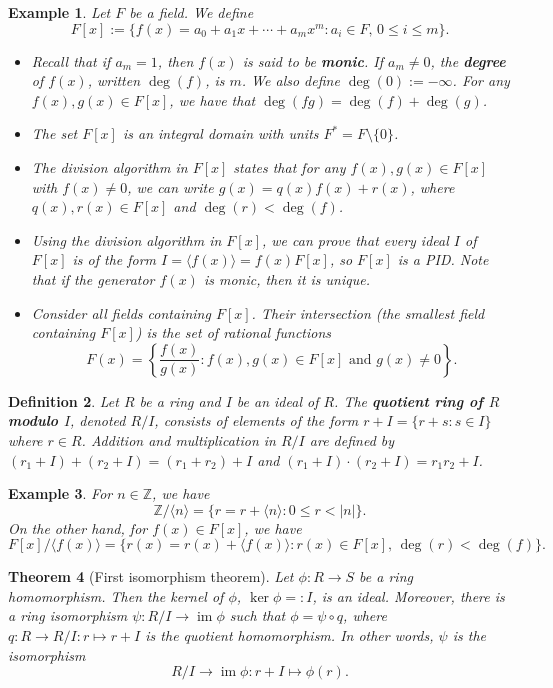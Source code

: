 \documentclass[10pt]{article}
\newcommand{\Z}{\mathbb{Z}}
\DeclareMathOperator{\im}{im}
\theoremstyle{newstyle}
\newtheorem{thm}{Theorem}[section]
\newtheorem{defn}[thm]{Definition}
\newtheorem{exmp}[thm]{Example}
\begin{document}
\begin{exmp}
Let $F$ be a field. We define 
\[ F[x] := \{f(x) = a_0 + a_1x + \cdots + a_mx^m : a_i \in F,\, 0 \leq i \leq m\}. \]
\begin{itemize}
    \item Recall that if $a_m = 1$, then $f(x)$ is said to be {\bf monic}. If $a_m \neq 0$, 
    the {\bf degree} of $f(x)$, written $\deg(f)$, is $m$. We also define $\deg(0) := -\infty$. 
    For any $f(x), g(x) \in F[x]$, we have that $\deg(fg) = \deg(f) + \deg(g)$.
    \item The set $F[x]$ is an integral domain with units $F^* = F \setminus \{0\}$. 
    \item The division algorithm in $F[x]$ states that for any $f(x), g(x) \in F[x]$ with 
    $f(x) \neq 0$, we can write $g(x) = q(x)f(x) + r(x)$, where $q(x), r(x) \in F[x]$ and 
    $\deg(r) < \deg(f)$.
    \item Using the division algorithm in $F[x]$, we can prove that every ideal $I$ of $F[x]$ 
    is of the form $I = \langle f(x) \rangle = f(x) F[x]$, so $F[x]$ is a PID. Note that if 
    the generator $f(x)$ is monic, then it is unique.
    \item Consider all fields containing $F[x]$. Their intersection (the smallest field containing 
    $F[x]$) is the set of rational functions 
    \[ F(x) = \left\{ \frac{f(x)}{g(x)} : f(x), g(x) \in F[x] \text{ and } g(x) \neq 0 \right\}. \]
\end{itemize}
\end{exmp}

\begin{defn}
Let $R$ be a ring and $I$ be an ideal of $R$. The {\bf quotient ring of $R$ modulo $I$}, 
denoted $R/I$, consists of elements of the form $r + I = \{r+s : s \in I\}$ where $r \in R$. 
Addition and multiplication in $R/I$ are defined by 
$(r_1 + I) + (r_2 + I) = (r_1 + r_2) + I$ and $(r_1 + I) \cdot (r_2 + I) = r_1r_2 + I$.
\end{defn}

\begin{exmp}
For $n \in \Z$, we have 
\[ \Z/\langle n \rangle = \{r = r + \langle n \rangle : 0 \leq r < |n|\}. \]
On the other hand, for $f(x) \in F[x]$, we have 
\[ F[x]/\langle f(x) \rangle = \{r(x) = r(x) + \langle f(x) \rangle : r(x) \in F[x],\, 
\deg(r) < \deg(f)\}. \]
\end{exmp}

\begin{thm}[First isomorphism theorem]
Let $\phi : R \to S$ be a ring homomorphism. Then the kernel of $\phi$, $\ker\phi =: I$, is an ideal. 
Moreover, there is a ring isomorphism $\psi : R/I \to \im\phi$ such that 
$\phi = \psi \circ q$, where $q : R \to R/I : r \mapsto r + I$ is the quotient homomorphism.
In other words, $\psi$ is the isomorphism 
\[ R/I \to \im\phi : r+I \mapsto \phi(r). \]
\end{thm}
\end{document}
